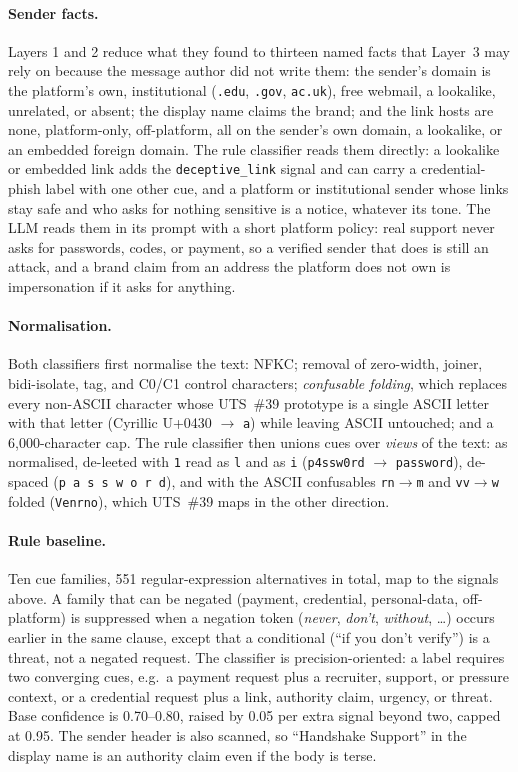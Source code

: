 \documentclass[10pt,twocolumn]{article}
\newcommand{\code}[1]{\texttt{#1}}
\newcommand{\cp}[1]{\mbox{U+#1}}
\begin{document}
\paragraph{Sender facts.} Layers 1 and 2 reduce what they found to thirteen named facts that Layer~3 may rely on because the message author did not write them: the sender's domain is the platform's own, institutional (\code{.edu}, \code{.gov}, \code{ac.uk}), free webmail, a lookalike, unrelated, or absent; the display name claims the brand; and the link hosts are none, platform-only, off-platform, all on the sender's own domain, a lookalike, or an embedded foreign domain. The rule classifier reads them directly: a lookalike or embedded link adds the \code{deceptive\_link} signal and can carry a credential-phish label with one other cue, and a platform or institutional sender whose links stay safe and who asks for nothing sensitive is a notice, whatever its tone. The LLM reads them in its prompt with a short platform policy: real support never asks for passwords, codes, or payment, so a verified sender that does is still an attack, and a brand claim from an address the platform does not own is impersonation if it asks for anything.

\paragraph{Normalisation.} Both classifiers first normalise the text: NFKC; removal of zero-width, joiner, bidi-isolate, tag, and C0/C1 control characters; \emph{confusable folding}, which replaces every non-ASCII character whose UTS~\#39 prototype is a single ASCII letter with that letter (Cyrillic \cp{0430} $\to$ \code{a}) while leaving ASCII untouched; and a 6{,}000-character cap. The rule classifier then unions cues over \emph{views} of the text: as normalised, de-leeted with \code{1} read as \code{l} and as \code{i} (\code{p4ssw0rd} $\to$ \code{password}), de-spaced (\code{p a s s w o r d}), and with the ASCII confusables \code{rn}$\to$\code{m} and \code{vv}$\to$\code{w} folded (\code{Venrno}), which UTS~\#39 maps in the other direction.

\paragraph{Rule baseline.} Ten cue families, 551 regular-expression alternatives in total, map to the signals above. A family that can be negated (payment, credential, personal-data, off-platform) is suppressed when a negation token (\emph{never}, \emph{don't}, \emph{without}, \ldots) occurs earlier in the same clause, except that a conditional (``if you don't verify'') is a threat, not a negated request. The classifier is precision-oriented: a label requires two converging cues, e.g.\ a payment request plus a recruiter, support, or pressure context, or a credential request plus a link, authority claim, urgency, or threat. Base confidence is 0.70--0.80, raised by 0.05 per extra signal beyond two, capped at 0.95. The sender header is also scanned, so ``Handshake Support'' in the display name is an authority claim even if the body is terse.
\end{document}

